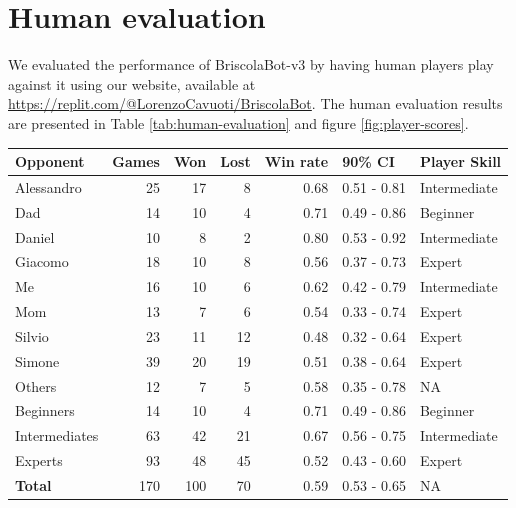\section{Human evaluation}
We evaluated the performance of BriscolaBot-v3 by having human players play against it using our website, available at \url{https://replit.com/@LorenzoCavuoti/BriscolaBot}. The human evaluation results are presented in Table \ref{tab:human-evaluation} and figure \ref{fig:player-scores}.

\begin{table}[H]
    \begin{tabular}{lrrrrll}
        \hline
        Opponent       & Games & Won & Lost & Win rate & 90\% CI     & Player Skill \\
        \hline
        Alessandro     & 25    & 17  & 8    & 0.68     & 0.51 - 0.81 & Intermediate \\
        Dad            & 14    & 10  & 4    & 0.71     & 0.49 - 0.86 & Beginner     \\
        Daniel         & 10    & 8   & 2    & 0.80     & 0.53 - 0.92 & Intermediate \\
        Giacomo        & 18    & 10  & 8    & 0.56     & 0.37 - 0.73 & Expert       \\
        Me             & 16    & 10  & 6    & 0.62     & 0.42 - 0.79 & Intermediate \\
        Mom            & 13    & 7   & 6    & 0.54     & 0.33 - 0.74 & Expert       \\
        Silvio         & 23    & 11  & 12   & 0.48     & 0.32 - 0.64 & Expert       \\
        Simone         & 39    & 20  & 19   & 0.51     & 0.38 - 0.64 & Expert       \\
        Others         & 12    & 7   & 5    & 0.58     & 0.35 - 0.78 & NA           \\
        \hline
        Beginners      & 14    & 10  & 4    & 0.71     & 0.49 - 0.86 & Beginner     \\

        Intermediates  & 63    & 42  & 21   & 0.67     & 0.56 - 0.75 & Intermediate \\
        Experts        & 93    & 48  & 45   & 0.52     & 0.43 - 0.60 & Expert       \\
        \hline
        \textbf{Total} & 170   & 100 & 70   & 0.59     & 0.53 - 0.65 & NA           \\
        \hline
    \end{tabular}


\end{table}
